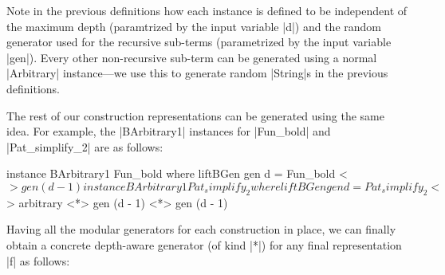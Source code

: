 Note in the previous definitions how each instance is defined to be independent
of the maximum depth (paramtrized by the input variable |d|) and the random
generator used for the recursive sub-terms (parametrized by the input variable
|gen|).
%
Every other non-recursive sub-term can be generated using a normal |Arbitrary|
instance---we use this to generate random |String|s in the previous definitions.


The rest of our construction representations can be generated using the same
idea.
%
For example, the |BArbitrary1| instances for |Fun_bold| and |Pat_simplify_2| are
as follows:

\begin{code}
instance BArbitrary1 Fun_bold where
  liftBGen gen d = Fun_bold <$> gen (d - 1)

instance BArbitrary1 Pat_simplify_2 where
  liftBGen gen d = Pat_simplify_2  <$> arbitrary
                                   <*> gen (d - 1)
                                   <*> gen (d - 1)
\end{code} %







Having all the modular generators for each construction in place, we can finally
obtain a concrete depth-aware generator (of kind |*|) for any final
representation |f| as follows:


